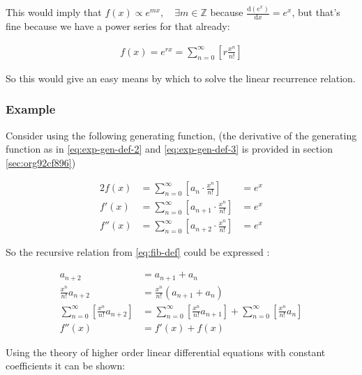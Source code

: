 \documentclass[11pt]{article}
\begin{document}
This would imply that \(f\left( x \right) \propto e^{mx}, \quad \exists m \in \mathbb{Z}\) because
\(\frac{\mathrm{d}\left( e^x \right) }{\mathrm{d} x} = e^x\), but that's
fine because we have a power series for that already:


\begin{align*}
f\left( x \right)= e^{rx} = \sum^{\infty}_{n= 0}   \left[ r \frac{x^n}{n!} \right]
\end{align*}


So this would give an easy means by which to solve the linear recurrence
relation.

\subsubsection{Example}
\label{sec:orgd72c493}
Consider using the following generating function, (the derivative of the generating function as in \eqref{eq:exp-gen-def-2} and \eqref{eq:exp-gen-def-3} is provided in section \ref{sec:org92cf896})




\begin{alignat}{2}
    f \left( x \right) &=  \sum^{\infty}_{n= 0}   \left[ a_{n} \cdot  \frac{x^n}{n!} \right]   &= e^x \label{eq:exp-gen-def-1} \\
    f'\left( x \right) &=  \sum^{\infty}_{n= 0}   \left[ a_{n+1} \cdot  \frac{x^n}{n!} \right]  &= e^x  \label{eq:exp-gen-def-2} \\
    f''\left( x \right) &=  \sum^{\infty}_{n= 0}   \left[ a_{n+2} \cdot  \frac{x^n}{n!} \right] &= e^x  \label{eq:exp-gen-def-3}
\end{alignat}


So the recursive relation from \ref{eq:fib-def}  could be expressed :


\begin{align*}
a_{n+  2}    &= a_{n+  1} +  a_{n}\\
\frac{x^n}{n!}   a_{n+  2}    &= \frac{x^n}{n!}\left( a_{n+  1} +  a_{n}  \right)\\
\sum^{\infty}_{n= 0} \left[ \frac{x^n}{n!}   a_{n+  2} \right]        &= \sum^{\infty}_{n= 0}   \left[ \frac{x^n}{n!} a_{n+  1} \right]  + \sum^{\infty}_{n= 0}   \left[ \frac{x^n}{n!} a_{n}  \right]  \\
f''\left( x \right) &= f'\left( x \right)+  f\left( x \right)
\end{align*}


Using the theory of higher order linear differential equations with
constant coefficients it can be shown:
\end{document}
